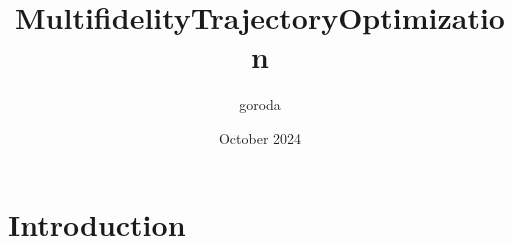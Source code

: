 \documentclass{article}
\title{MultifidelityTrajectoryOptimization}
\author{goroda }
\date{October 2024}
\begin{document}
\maketitle

\section{Introduction}
\end{document}
